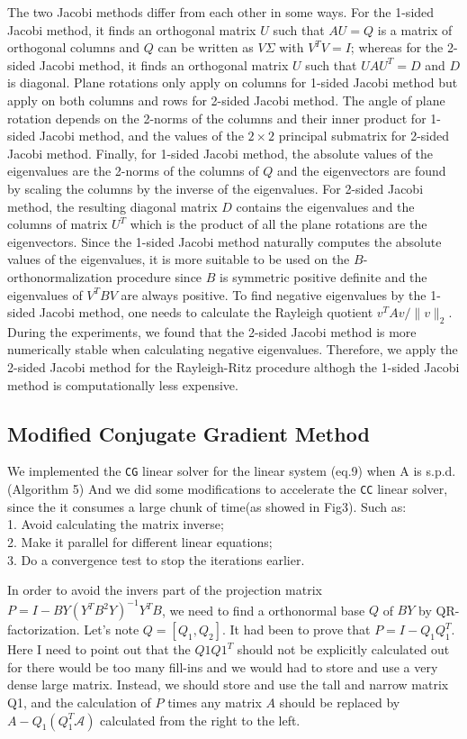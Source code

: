 The two Jacobi methods differ from each other in some ways. For the 1-sided Jacobi method, it finds an orthogonal
matrix $U$ such that $A U = Q$ is a matrix of orthogonal columns and $Q$ can be written as $V \Sigma$ with
$V^T V = I$; whereas for the 2-sided Jacobi method, it finds an orthogonal matrix $U$ such that $UAU^T = D$ and
$D$ is diagonal. Plane rotations only apply on columns for 1-sided Jacobi method but apply on both columns and rows
for 2-sided Jacobi method. The angle of plane rotation depends on the 2-norms of the columns and their inner
product for 1-sided Jacobi method, and the values of the $2 \times 2$ principal submatrix for 2-sided Jacobi method.
Finally, for 1-sided Jacobi method, the absolute values of the eigenvalues are the 2-norms of the columns of $Q$ and
the eigenvectors are found by scaling the columns by the inverse of the eigenvalues. For 2-sided Jacobi method, the
resulting diagonal matrix $D$ contains the eigenvalues and the columns of matrix $U^T$ which is the product of all
the plane rotations are the eigenvectors. Since the 1-sided Jacobi method naturally computes the absolute values of
the eigenvalues, it is more suitable to be used on the $B$-orthonormalization procedure since $B$ is symmetric
positive definite and the eigenvalues of $V^T B V$ are always positive. To find negative eigenvalues by the 1-sided
Jacobi method, one needs to calculate the Rayleigh quotient $v^T A v / \|v\|_2$. During the experiments, we found
that the 2-sided Jacobi method is more numerically stable when calculating negative eigenvalues. Therefore, we
apply the 2-sided Jacobi method for the Rayleigh-Ritz procedure althogh the 1-sided Jacobi method is computationally
less expensive.

\subsection{Modified Conjugate Gradient Method}
We implemented the {\tt CG} linear solver for the linear system (eq.9) when A is s.p.d.(Algorithm 5) And we did some modifications to accelerate the {\tt CC} linear solver, since the it consumes a large chunk of time(as showed in Fig3). Such as:\\1. Avoid calculating the matrix inverse;\\2. Make it parallel for different linear equations;\\3. Do a convergence test to stop the iterations earlier.


In order to avoid the invers part of the projection matrix $P=I-BY(Y^TB^2Y)^{-1}Y^TB$, we need to find a orthonormal base $Q$ of $BY$ by QR-factorization. Let's note $Q=[Q_1, Q_2]$. It had been to prove that $P=I-Q_1Q_1^T$. Here I need to point out that the $Q1Q1^T$ should not be explicitly calculated out for there would be too many fill-ins and we would had to store and use a very dense large  matrix. Instead, we should store and use the tall and narrow matrix Q1, and the calculation of $P$ times any matrix $A$ should be replaced by $A-Q_1(Q_1^T\mathcal{A})$ calculated from the right to the left.  


